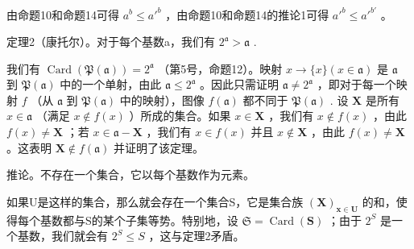 由命题10和命题14可得 \(a^b \leqslant a'^b\) ，由命题10和命题14的推论1可得 \(a'^b \leqslant a'^{b'}\) 。

定理2（康托尔）。对于每个基数a，我们有 \(2^{\mathfrak{a}} > \mathfrak{a}\) .

我们有 \(\operatorname{Card}(\mathfrak{P}(\mathfrak{a})) = 2^{\mathfrak{a}}\) （第5号，命题12）。映射 \(x \to \{x\} (x \in \mathfrak{a})\) 是 \(\mathfrak{a}\) 到 \(\mathfrak{P}(\mathfrak{a})\) 中的一个单射，由此 \(\mathfrak{a} \leqslant 2^{\mathfrak{a}}\) 。因此只需证明 \(\mathfrak{a} \neq 2^{\mathfrak{a}}\) ，即对于每一个映射 \(f\) （从 \(\mathfrak{a}\) 到 \(\mathfrak{P}(\mathfrak{a})\) 中的映射），图像 \(f(\mathfrak{a})\) 都不同于 \(\mathfrak{P}(\mathfrak{a})\) . 设 \(\mathbf{X}\) 是所有 \(x \in \mathfrak{a}\) （满足 \(x \notin f(x)\) ）所成的集合。如果 \(x \in \mathbf{X}\) ，我们有 \(x \notin f(x)\) ，由此 \(f(x) \neq \mathbf{X}\) ；若 \(x \in \mathfrak{a} - \mathbf{X}\) ，我们有 \(x \in f(x)\) 并且 \(x \notin \mathbf{X}\) ，由此 \(f(x) \neq \mathbf{X}\) 。这表明 \(\mathbf{X} \notin f(\mathfrak{a})\) 并证明了该定理。

推论。不存在一个集合，它以每个基数作为元素。

如果U是这样的集合，那么就会存在一个集合S，它是集合族 \((\mathbf{X})_{\mathbf{x}\in\mathbf{U}}\) 的和，使得每个基数都与S的某个子集等势。特别地，设 \(\mathfrak{S}=\operatorname{Card}(\mathbf{S})\) ；由于 \(2^{S}\) 是一个基数，我们就会有 \(2^{S}\leqslant S\) ，这与定理2矛盾。

